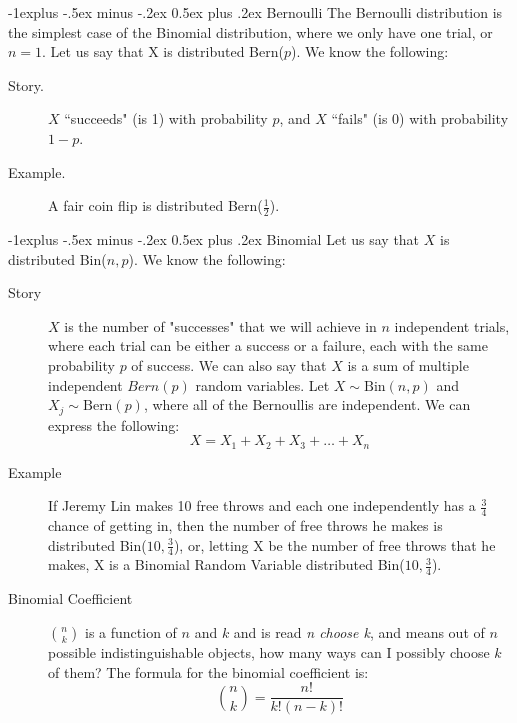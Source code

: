 \documentclass[10pt,landscape]{article}
\makeatletter
\newcommand{\Bern}{\textrm{Bern}}
\newcommand{\Bin}{\textrm{Bin}}
\renewcommand{\subsection}{\@startsection{subsection}{2}{0mm}%
                                {-1explus -.5ex minus -.2ex}%
                                {0.5ex plus .2ex}%
                                {\normalfont\normalsize\bfseries}}
\makeatother
\begin{document}
\begin{multicols}{3}
\subsection{Bernoulli} The Bernoulli distribution is the simplest case of the Binomial distribution, where we only have one trial, or $n=1$. Let us say that X is distributed \Bern($p$). We know the following:
\begin{description}
    \item[Story.] $X$ ``succeeds" (is 1) with probability $p$, and $X$ ``fails" (is 0) with probability $1-p$.
    \item[Example.] A fair coin flip is distributed \Bern($\frac{1}{2}$).
\end{description}

\subsection{Binomial} Let us say that $X$ is distributed \Bin($n,p$). We know the following:
\begin{description}
    \item[Story] $X$ is the number of "successes" that we will achieve in $n$ independent trials, where each trial can be either a success or a failure, each with the same probability $p$ of success. We can also say that $X$ is a sum of multiple independent $Bern(p)$ random variables. Let $X \sim \Bin(n, p)$ and $X_j \sim \Bern(p)$, where all of the Bernoullis are independent. We can express the following:
    \[X = X_1 + X_2 + X_3 + \dots + X_n\]
    \item[Example] If Jeremy Lin makes 10 free throws and each one independently has a $\frac{3}{4}$ chance of getting in, then the number of free throws he makes is distributed  \Bin($10,\frac{3}{4}$), or, letting X be the number of free throws that he makes, X is a Binomial Random Variable distributed  \Bin($10,\frac{3}{4}$).
    \item[Binomial Coefficient] ${n  \choose k}$ is a function of $n$ and $k$ and is read \emph{n choose k}, and means out of $n$ possible indistinguishable objects, how many ways can I possibly choose $k$ of them? The formula for the binomial coefficient is:
\[{n  \choose k} = \frac{n!}{k!(n-k)!}\]
\end{description}



\end{multicols}
\end{document}
